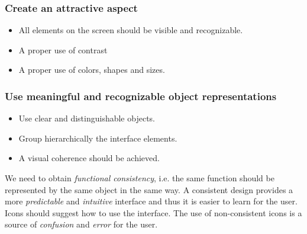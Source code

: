 \documentclass[11pt,a4paper]{article}
\theoremstyle{definition}
\theoremstyle{plain}
\theoremstyle{remark}
\begin{document}
\subsubsection{Create an attractive aspect}
\begin{itemize}
\item All elements on the screen should be visible and recognizable.
\item A proper use of contrast
\item A proper use of colors, shapes and sizes.
\end{itemize}

\subsubsection{Use meaningful and recognizable object representations}
\begin{itemize}
    \item Use clear and distinguishable objects.
    \item Group hierarchically the interface elements.
    \item A visual coherence should be achieved.
\end{itemize}

\begin{tcolorbox}[colback=teal!5!white,colframe=teal!75!black,title=\textbf{Functional Consistency}]
We need to obtain \textit{functional consistency}, i.e. the same function should be represented by the same object in the same way.
A consistent design provides a more \textit{predictable} and \textit{intuitive} interface and thus it is easier to learn for the user.
Icons should suggest how to use the interface. The use of non-consistent icons is a source of \textit{confusion} and \textit{error} for the user.
\end{tcolorbox}
\end{document}

